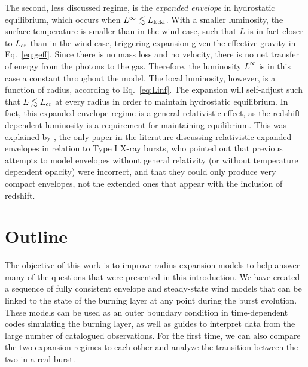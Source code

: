 \documentclass[../main.tex]{subfiles}
\begin{document}
The second, less discussed regime, is the \textit{expanded envelope} in hydrostatic equilibrium, which occurs when $L^\infty \lesssim L_\text{Edd}$. With a smaller luminosity, the surface temperature is smaller than in the wind case, such that $L$ is in fact closer to $L_\text{cr}$ than in the wind case, triggering expansion given the effective gravity in Eq.~\eqref{eq:geff}. Since there is no mass loss and no velocity, there is no net transfer of energy from the photons to the gas. Therefore, the luminosity $L^\infty$ is in this case a constant throughout the model. The local luminosity, however, is a function of radius, according to Eq.~\eqref{eq:Linf}. The expansion will self-adjust such that $L\lesssim L_\text{cr}$ at every radius in order to maintain hydrostatic equilibrium. In fact, this expanded envelope regime is a general relativistic effect, as the redshift-dependent luminosity is a requirement for maintaining equilibrium. This was explained by \citet{Paczynski1986a}, the only paper in the literature discussing relativistic expanded envelopes in relation to Type I X-ray bursts, who pointed out that previous attempts to model envelopes without general relativity (or without temperature dependent opacity) were incorrect, and that they could only produce very compact envelopes, not the extended ones that appear with the inclusion of redshift.

\section{Outline}\label{section:outline}


The objective of this work is to improve radius expansion models to help answer many of the questions that were presented in this introduction. We have created a sequence of fully consistent envelope and steady-state wind models that can be linked to the state of the burning layer at any point during the burst evolution. These models can be used as an outer boundary condition in time-dependent codes simulating the burning layer, as well as guides to interpret data from the large number of catalogued observations. For the first time, we can also compare the two expansion regimes to each other and analyze the transition between the two in a real burst. 
\end{document}
